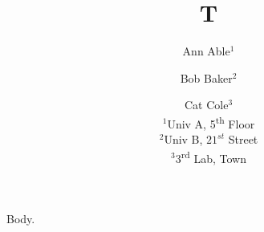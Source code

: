 \documentclass{article}
\begin{document}
\title{T}
\author{Ann Able$^1$ \and Bob Baker$^2$ \and Cat Cole$^3$\\ $^1$Univ A, 5\textsuperscript{th} Floor\\ $^2$Univ B, $21^{st}$ Street\\ $^3$3\textsuperscript{rd} Lab, Town}
\maketitle
Body.
\end{document}
